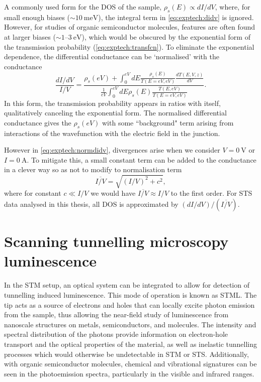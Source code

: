 A commonly used form for the \ac{DOS} of the sample, $\rho_s(E) \propto dI/dV $, where, for small enough biases ($\sim \SI{10}{\milli\electronvolt}$), the integral term in \autoref{eq:exptech:didv} is ignored. However, for studies of organic semiconductor molecules, features are often found at larger biases ($\sim 1$--$\SI{3}{\electronvolt}$), which would be obscured by the exponential form of the transmission probability (\autoref{eq:exptech:transfcn}). To eliminate the exponential dependence, the differential conductance can be `normalised' with the conductance
\begin{equation} \label{eq:exptech:normdidv}
\frac{dI/dV}{I/V} = \frac{\rho_s(eV) + \int_0 ^{eV} dE \frac{\rho_s(E)}{T(E=eV,eV)} \frac{dT(E,V,z)}{dV}}{ \frac{1}{eV} \int_0^{eV} dE \rho_s(E) \frac{T(E,eV)}{T(E=eV,eV)}}.
\end{equation}
In this form, the transmission probability appears in ratios with itself, qualitatively canceling the exponential form. The normalised differential conductance gives the $\rho_s(eV)$ with some ``background" term arising from interactions of the wavefunction with the electric field in the junction.

However in \autoref{eq:exptech:normdidv}, divergences arise when we consider $V=\SI{0}{\volt}$ or $I= \SI{0}{\ampere}$. To mitigate this, a small constant term can be added to the conductance in a clever way so as not to modify to normalisation term
\begin{equation}
    \overline{I/V} = \sqrt{(I/V)^2 + c^2},
\end{equation}
where for constant $c\ll I/V$ we would have $\overline{I/V} \approx I/V$ to the first order. For \ac{STS} data analysed in this thesis, all \ac{DOS} is approximated by $ (dI/dV) / (\overline{I/V})$.

\section{Scanning tunnelling microscopy luminescence}

In the \ac{STM} setup, an optical system can be integrated to allow for detection of tunnelling induced luminescence. This mode of operation is known as \acf{STML}. The tip acts as a source of electrons and holes that can locally excite photon emission from the sample, thus allowing the near-field study of luminescence from nanoscale structures on metals, semiconductors, and molecules. The intensity and spectral distribution of the photons provide information on electron-hole transport and the optical properties of the material, as well as inelastic tunnelling processes which would otherwise be undetectable in \ac{STM} or \ac{STS}. Additionally, with organic semiconductor molecules, chemical and vibrational signatures can be seen in the photoemission spectra, particularly in the visible and infrared ranges.

